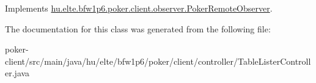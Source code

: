 Implements \hyperlink{interfacehu_1_1elte_1_1bfw1p6_1_1poker_1_1client_1_1observer_1_1_poker_remote_observer_a3b701b6771f57bd6fb8afb247d08c47d}{hu.\+elte.\+bfw1p6.\+poker.\+client.\+observer.\+Poker\+Remote\+Observer}.



The documentation for this class was generated from the following file\+:\begin{DoxyCompactItemize}
\item 
poker-\/client/src/main/java/hu/elte/bfw1p6/poker/client/controller/Table\+Lister\+Controller.\+java\end{DoxyCompactItemize}
